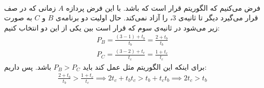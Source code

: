 \\\noindent
فرض می‌کنیم که الگوریتم
قرار است که
باشد. با این فرض پردازه
$A$
زمانی که در صف قرار می‌گیرد دیگر تا ثانیه‌ی 3،
را آزاد نمی‌کند.
حال اولیت دو برنامه‌ی
$B$ و $C$
به صورت زیر می‌شود در ثانیه‌ی سوم که قرار است بین یکی از این دو انتخاب کنیم:
\begin{gather*}
    P_B = \frac{(3 - 1) + t_b}{t_b} = \frac{2 + t_b}{t_b}\\
    P_C = \frac{(3 - 2) + t_c}{t_c} = \frac{1 + t_c}{t_c}
\end{gather*}
برای اینکه این الگوریتم مثل
عمل کند باید
$P_B > P_C$
باشد. پس داریم:
\begin{gather*}
    \frac{2 + t_b}{t_b} > \frac{1 + t_c}{t_c} \implies 2t_c + t_b t_c > t_b + t_c t_b \implies 2t_c > t_b
\end{gather*}




